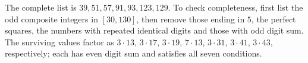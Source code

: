 The complete list is $\boxed{39,51,57,91,93,123,129}$. To check completeness, first list the odd composite integers in $[30,130]$, then remove those ending in $5$, the perfect squares, the numbers with repeated identical digits and those with odd digit sum. The surviving values factor as $3\cdot13$, $3\cdot17$, $3\cdot19$, $7\cdot13$, $3\cdot31$, $3\cdot41$, $3\cdot43$, respectively; each has even digit sum and satisfies all seven conditions.
